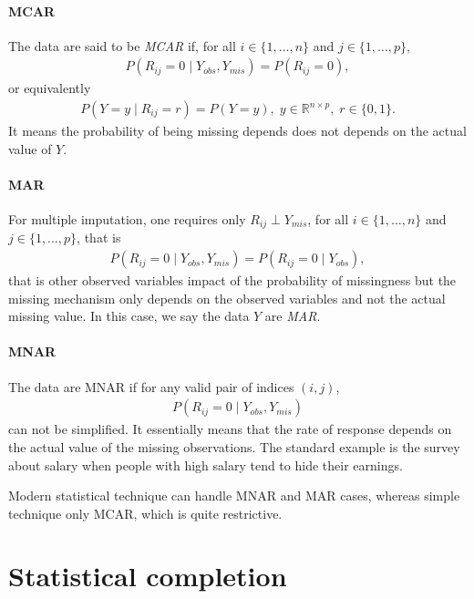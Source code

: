 \paragraph{MCAR}

The data are said to be \emph{MCAR} if, for all $i \in \{1, \dots, n\}$ and
$j \in \{1, \dots, p\}$,
\begin{align*}
P(R_{ij}=0 \; \vert \;  Y_{obs}, Y_{mis}) = P(R_{ij}=0),
\end{align*}
or equivalently
\begin{align*}
  P(Y = y \; \vert \;  R_{ij}=r) = P(Y=y), \; y \in \mathbb{R}^{n\times p}, \; r \in \{0, 1\}.
\end{align*}
It means the probability of being missing depends does not depends on the
actual value of $Y$.

\paragraph{MAR} For multiple imputation, one requires only $R_{ij} \perp Y_{mis}$,
for all $i \in \{1, \dots, n\}$ and $j \in \{1, \dots, p\}$, that is
\begin{align*}
  P(R_{ij}=0 \; \vert \;  Y_{obs}, Y_{mis}) = P(R_{ij}=0 \; \vert \;  Y_{obs}),
\end{align*}
that is other observed variables impact of the probability of missingness but
the missing mechanism only depends on the observed variables and not the actual
missing value. In this case, we say the data $Y$ are \emph{MAR}.

\paragraph{MNAR}
The data are MNAR if for any valid pair of indices $(i, j)$,
\begin{align*}
  P(R_{ij}=0 \; \vert \;  Y_{obs}, Y_{mis})
\end{align*}
can not be simplified. It essentially means that the rate of response depends
on the actual value of the missing observations. The standard example is the
survey about salary when people with high salary tend to hide their
earnings.

Modern statistical technique can handle MNAR and MAR cases, whereas simple
technique only MCAR, which is quite restrictive.

\section{Statistical completion}
\label{sec:stand-appr-miss}

